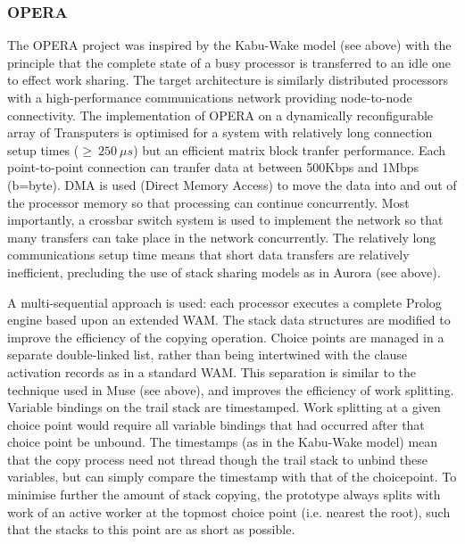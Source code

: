 
\subsubsection{OPERA}

The OPERA project \cite{B+92} was inspired by the Kabu-Wake model (see above) with the
principle that the complete state of a busy processor is transferred to an idle one
to effect work sharing.  The target architecture is similarly distributed processors with
a high-performance communications network providing node-to-node connectivity.  The
implementation of OPERA on a dynamically reconfigurable array of Transputers is optimised
for a system with relatively long connection setup times ($\geq\ 250\ \mu s$) but an
efficient matrix block tranfer performance. Each point-to-point connection can tranfer
data at between 500Kbps and 1Mbps (b=byte).  DMA is used (Direct Memory Access) to move
the data into and out of the processor memory so that processing can continue concurrently.
Most importantly, a crossbar switch system is used to implement the network so that many
transfers can take place in the network concurrently.  The relatively long communications
setup time means that short data transfers are relatively inefficient, precluding the
use of stack sharing models as in Aurora (see above).

A multi-sequential approach is used: each processor executes a complete Prolog engine based
upon an extended WAM.  The stack data structures are modified to improve the
efficiency of the copying operation.
Choice points are managed in a separate double-linked list,  rather than
being intertwined with the clause activation records as in a standard WAM.  This separation is
similar to the technique used in Muse (see above), and improves the efficiency of work splitting.
Variable bindings on the trail stack are timestamped.  Work splitting at a given choice point
would require all variable bindings that had occurred after that choice point be unbound.  The
timestamps (as in the Kabu-Wake model) mean that the copy process need not thread though the
trail stack to unbind these variables, but can simply compare the timestamp with that of
the choicepoint.  To minimise further the amount of stack copying, the prototype always splits
with work of an active worker at the topmost choice point (i.e. nearest the root), such that the
stacks to this point are as short as possible.

